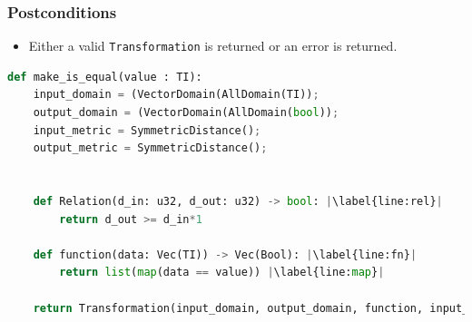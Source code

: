 \documentclass[11pt,a4paper]{article}
\newcommand{\grace}[1]{{ {\color{purple}{(grace)~#1}}}}
\begin{document}
\subsubsection*{Postconditions}

\begin{itemize}
    \item Either a valid \texttt{Transformation} is returned or an error is returned.
\end{itemize}

\begin{lstlisting}[language=Python, escapechar=|]
def make_is_equal(value : TI):
    input_domain = (VectorDomain(AllDomain(TI));
    output_domain = (VectorDomain(AllDomain(bool));
    input_metric = SymmetricDistance(); 
    output_metric = SymmetricDistance();
    
    
    def Relation(d_in: u32, d_out: u32) -> bool: |\label{line:rel}|
        return d_out >= d_in*1
        
    def function(data: Vec(TI)) -> Vec(Bool): |\label{line:fn}|
        return list(map(data == value)) |\label{line:map}|

    return Transformation(input_domain, output_domain, function, input_metric, output_metric, Relation)
\end{lstlisting}

\grace{ For the next round of the updates, will need to change pseudocode so that it returns the result of a make row by row transformation (which the code does). }
\end{document}
